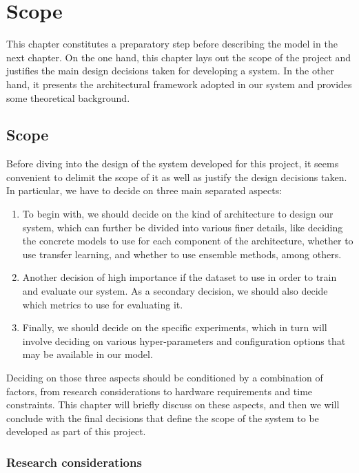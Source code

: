 \chapter{Scope}
\label{ch:scope}

This chapter constitutes a preparatory step before describing the model in the next chapter. On the one hand, this chapter lays out the scope of the project and justifies the main design decisions taken for developing a system. In the other hand, it presents the architectural framework adopted in our system and provides some  theoretical background.

\section{Scope}\label{sec:scope}

Before diving into the design of the system developed for this project, it seems convenient to delimit the scope of it as well as justify the design decisions taken. In particular, we have to decide on three main separated aspects:

\begin{enumerate}
\item To begin with, we should decide on the kind of architecture to design our system, which can further be divided into various finer details, like deciding the concrete models to use for each component of the architecture, whether to use transfer learning, and whether to use ensemble methods, among others.
\item Another decision of high importance if the dataset to use in order to train and evaluate our system. As a secondary decision, we should also decide which metrics to use for evaluating it.
\item Finally, we should decide on the specific experiments, which in turn will involve deciding on various hyper-parameters and configuration options that may be available in our model.
\end{enumerate}

Deciding on those three aspects should be conditioned by a combination of factors, from research considerations to hardware requirements and time constraints. This chapter will briefly discuss on these aspects, and then we will conclude with the final decisions that define the scope of the system to be developed as part of this project.

\subsection{Research considerations}

